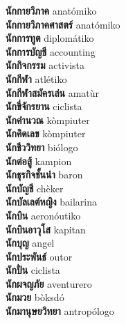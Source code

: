 \textbf{ นักกายวิภาค  } anatómiko \\
\textbf{ นักกายวิภาคศาสตร์  } anatómiko \\
\textbf{ นักการทูต  } diplomátiko \\
\textbf{ นักการบัญชี  } accounting \\
\textbf{ นักกิจกรรม  } activista \\
\textbf{ นักกีฬา  } atlétiko \\
\textbf{ นักกีฬาสมัครเล่น  } amatùr \\
\textbf{ นักขี่จักรยาน  } ciclista \\
\textbf{ นักคำนวณ  } kòmpiuter \\
\textbf{ นักคิดเลข  } kòmpiuter \\
\textbf{ นักชีววิทยา  } biólogo \\
\textbf{ นักต่อสู้  } kampion \\
\textbf{ นักธุรกิจชั้นนำ  } baron \\
\textbf{ นักบัญชี  } chèker \\
\textbf{ นักบัลเลต์หญิง  } bailarina \\
\textbf{ นักบิน  } aeronóutiko \\
\textbf{ นักบินอาวุโส  } kapitan \\
\textbf{ นักบุญ  } angel \\
\textbf{ นักประพันธ์  } outor \\
\textbf{ นักปั่น  } ciclista \\
\textbf{ นักผจญภัย  } aventurero \\
\textbf{ นักมวย  } bòksdó \\
\textbf{ นักมานุษยวิทยา  } antropólogo \\
